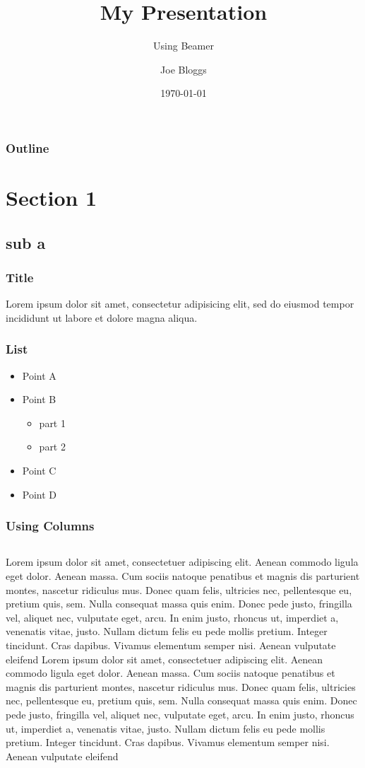\documentclass{beamer}
\title{My Presentation}
\subtitle{Using Beamer}
\author{Joe Bloggs}
\institute{University of ShareLaTeX}
\date{\today}
\begin{document}
\begin{frame}
\titlepage
\end{frame}

\begin{frame}
\label{contents}
\frametitle{Outline}
\tableofcontents
\end{frame}

\section{Section 1}
\subsection{sub a}

\begin{frame}
\frametitle{Title}
Lorem ipsum dolor sit amet, consectetur adipisicing elit, sed do eiusmod tempor incididunt ut labore et dolore magna aliqua.
\end{frame}

\begin{frame}
\frametitle{List}
\begin{itemize}
\item Point A
\item Point B
\begin{itemize}
\item part 1
\item part 2
\end{itemize}
\item Point C
\item Point D
\end{itemize}
\end{frame}

\begin{frame}
\frametitle{Using Columns}
\begin{columns}
Lorem ipsum dolor sit amet, consectetuer adipiscing elit. Aenean commodo ligula
eget dolor. Aenean massa. Cum sociis natoque penatibus et magnis dis parturient
montes, nascetur ridiculus mus. Donec quam felis, ultricies nec, pellentesque
eu, pretium quis, sem. Nulla consequat massa quis enim. Donec pede justo,
fringilla vel, aliquet nec, vulputate eget, arcu. In enim justo, rhoncus ut,
imperdiet a, venenatis vitae, justo. Nullam dictum felis eu pede mollis pretium.
Integer tincidunt. Cras dapibus. Vivamus elementum semper nisi. Aenean vulputate
eleifend
Lorem ipsum dolor sit amet, consectetuer adipiscing elit. Aenean commodo ligula
eget dolor. Aenean massa. Cum sociis natoque penatibus et magnis dis parturient
montes, nascetur ridiculus mus. Donec quam felis, ultricies nec, pellentesque
eu, pretium quis, sem. Nulla consequat massa quis enim. Donec pede justo,
fringilla vel, aliquet nec, vulputate eget, arcu. In enim justo, rhoncus ut,
imperdiet a, venenatis vitae, justo. Nullam dictum felis eu pede mollis pretium.
Integer tincidunt. Cras dapibus. Vivamus elementum semper nisi. Aenean vulputate
eleifend
\end{columns}
\end{frame}
\end{document}
